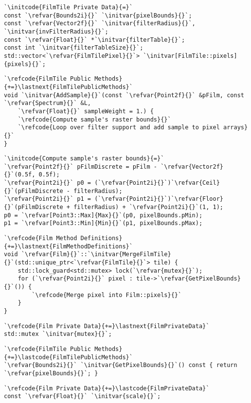 \begin{lstlisting}
`\initcode{FilmTile Private Data}{=}`
const `\refvar{Bounds2i}{}` `\initvar{pixelBounds}{}`;
const `\refvar{Vector2f}{}` `\initvar{filterRadius}{}`, `\initvar{invFilterRadius}{}`;
const `\refvar{Float}{}` *`\initvar{filterTable}{}`;
const int `\initvar{filterTableSize}{}`;
std::vector<`\refvar{FilmTilePixel}{}`> `\initvar[FilmTile::pixels]{pixels}{}`;
\end{lstlisting}

\begin{lstlisting}
`\refcode{FilmTile Public Methods}{+=}\lastnext{FilmTilePublicMethods}`
void `\initvar{AddSample}{}`(const `\refvar{Point2f}{}` &pFilm, const `\refvar{Spectrum}{}` &L,
    `\refvar{Float}{}` sampleWeight = 1.) {
    `\refcode{Compute sample's raster bounds}{}`
    `\refcode{Loop over filter support and add sample to pixel arrays}{}`
}
\end{lstlisting}

\begin{lstlisting}
`\initcode{Compute sample's raster bounds}{=}`
`\refvar{Point2f}{}` pFilmDiscrete = pFilm - `\refvar{Vector2f}{}`(0.5f, 0.5f);
`\refvar{Point2i}{}` p0 = (`\refvar{Point2i}{}`)`\refvar{Ceil}{}`(pFilmDiscrete - filterRadius);
`\refvar{Point2i}{}` p1 = (`\refvar{Point2i}{}`)`\refvar{Floor}{}`(pFilmDiscrete + filterRadius) + `\refvar{Point2i}{}`(1, 1);
p0 = `\refvar[Point3::Max]{Max}{}`(p0, pixelBounds.pMin);
p1 = `\refvar[Point3::Min]{Min}{}`(p1, pixelBounds.pMax);
\end{lstlisting}

\begin{lstlisting}
`\refcode{Film Method Definitions}{+=}\lastnext{FilmMethodDefinitions}`
void `\refvar{Film}{}`::`\initvar{MergeFilmTile}{}`(std::unique_ptr<`\refvar{FilmTile}{}`> tile) {
    std::lock_guard<std::mutex> lock(`\refvar{mutex}{}`);
    for (`\refvar{Point2i}{}` pixel : tile->`\refvar{GetPixelBounds}{}`()) {
        `\refcode{Merge pixel into Film::pixels}{}`
    }
}
\end{lstlisting}
\begin{lstlisting}
`\refcode{Film Private Data}{+=}\lastnext{FilmPrivateData}`
std::mutex `\initvar{mutex}{}`;
\end{lstlisting}
\begin{lstlisting}
`\refcode{FilmTile Public Methods}{+=}\lastcode{FilmTilePublicMethods}`
`\refvar{Bounds2i}{}` `\initvar{GetPixelBounds}{}`() const { return `\refvar{pixelBounds}{}`; }
\end{lstlisting}
\begin{lstlisting}
`\refcode{Film Private Data}{+=}\lastcode{FilmPrivateData}`
const `\refvar{Float}{}` `\initvar{scale}{}`;
\end{lstlisting}


